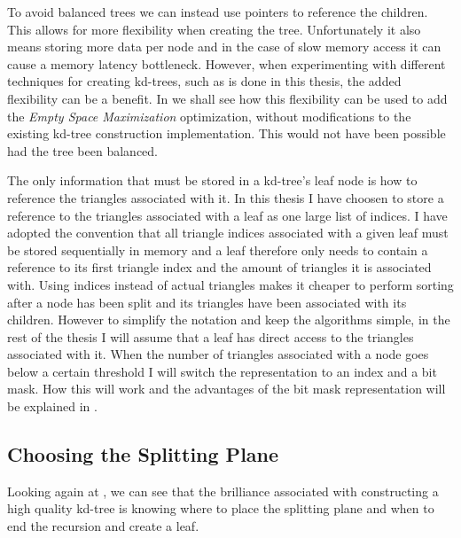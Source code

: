 To avoid balanced trees we can instead use pointers to reference the
children. This allows for more flexibility when creating the tree. Unfortunately
it also means storing more data per node and in the case of slow memory access
it can cause a memory latency bottleneck. However, when experimenting with
different techniques for creating kd-trees, such as is done in this thesis, the
added flexibility can be a benefit. In  we shall
see how this flexibility can be used to add the \textit{Empty Space Maximization}
optimization, without modifications to the existing kd-tree construction
implementation. This would not have been possible had the tree been balanced.


The only information that must be stored in a kd-tree's leaf node is how to
reference the triangles associated with it. In this thesis I have choosen to
store a reference to the triangles associated with a leaf as one large list of
indices. I have adopted the convention that all triangle indices associated with
a given leaf must be stored sequentially in memory and a leaf therefore only
needs to contain a reference to its first triangle index and the amount of
triangles it is associated with. Using indices instead of actual triangles makes
it cheaper to perform sorting after a node has been split and its triangles have
been associated with its children. However to simplify the notation and keep the
algorithms simple, in the rest of the thesis I will assume that a leaf has
direct access to the triangles associated with it. When the number of triangles
associated with a node goes below a certain threshold I will switch the
representation to an index and a bit mask. How this will work and the advantages
of the bit mask representation will be explained in .


\subsection{Choosing the Splitting Plane}\label{sec:splittingPlane}


Looking again at , we can see that the brilliance
associated with constructing a high quality kd-tree is knowing where to place
the splitting plane and when to end the recursion and create a leaf.

